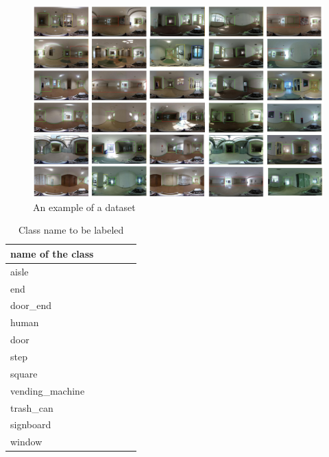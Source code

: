 \documentclass[../main]{subfiles}
\begin{document}
        \begin{figure}[H]
         \centering
         \includegraphics[width=16cm]{../images/dataset_exp.png}
         \caption{An example of a dataset}
         \label{figure::dataset_fig}
        \end{figure}

        \begin{table}[H]
            \caption{Class name to be labeled}
            \centering
            \label{table::datasets_table}
            \begin{tabular}{lllll}
            \hline
            name of the class &  &  &  &  \\ 
            \hline \hline
            aisle             &  &  &  &  \\
            end               &  &  &  &  \\
            door\_end         &  &  &  &  \\
            human             &  &  &  &  \\
            door              &  &  &  &  \\
            step              &  &  &  &  \\
            square            &  &  &  &  \\
            vending\_machine  &  &  &  &  \\
            trash\_can        &  &  &  &  \\
            signboard         &  &  &  &  \\
            window            &  &  &  &  \\ 
            \hline
            \end{tabular}
        \end{table}            
\end{document}
